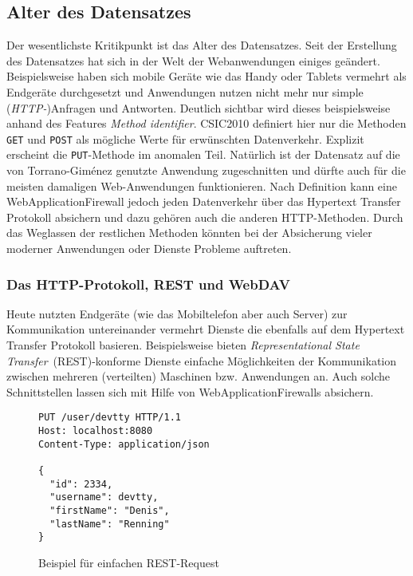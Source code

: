 \subsection{Alter des Datensatzes}

Der wesentlichste Kritikpunkt ist das Alter des Datensatzes. Seit der Erstellung des Datensatzes hat sich in der Welt der Webanwendungen einiges geändert. Beispielsweise haben sich mobile Geräte wie das Handy oder Tablets vermehrt als Endgeräte durchgesetzt und Anwendungen nutzen nicht mehr nur simple (\emph{HTTP-})Anfragen und Antworten. Deutlich sichtbar wird dieses beispielsweise anhand des Features \glqq\emph{Method identifier}\grqq. CSIC2010 definiert hier nur die Methoden \verb=GET= und \verb=POST= als mögliche Werte für erwünschten Datenverkehr. Explizit erscheint die \verb=PUT=-Methode im anomalen Teil. Natürlich ist der Datensatz auf die von Torrano-Giménez genutzte Anwendung zugeschnitten und dürfte auch für die meisten damaligen Web-Anwendungen funktionieren. Nach Definition kann eine WebApplicationFirewall jedoch jeden Datenverkehr über das Hypertext Transfer Protokoll absichern und dazu gehören auch die anderen HTTP-Methoden. Durch das Weglassen der restlichen Methoden könnten bei der Absicherung vieler moderner Anwendungen oder Dienste Probleme auftreten. 

\subsubsection{Das HTTP-Protokoll, REST und WebDAV}
Heute nutzten Endgeräte (wie das Mobiltelefon aber auch Server) zur Kommunikation untereinander vermehrt Dienste die ebenfalls auf dem Hypertext Transfer Protokoll basieren. Beispielsweise bieten \emph{Representational State Transfer}~(REST)-konforme Dienste einfache Möglichkeiten der Kommunikation zwischen mehreren (verteilten) Maschinen bzw. Anwendungen an. Auch solche Schnittstellen lassen sich mit Hilfe von WebApplicationFirewalls absichern.\\

\begin{figure}[h]
  \begin{lstlisting}
PUT /user/devtty HTTP/1.1
Host: localhost:8080
Content-Type: application/json

{
  "id": 2334,
  "username": devtty,
  "firstName": "Denis",
  "lastName": "Renning"
}
\end{lstlisting}
  \caption{Beispiel für einfachen REST-Request}
  \label{fig:restputexample}

\end{figure}

